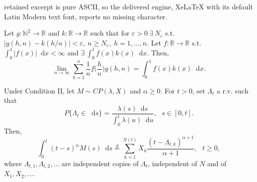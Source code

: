 \documentclass[10pt,a4paper]{amsart}
\newcommand*\dif{\mathop{}\!\mathrm{d}}  %
\begin{document}
retained excerpt is pure ASCII, so the delivered engine, XeLaTeX with its default Latin Modern text font, reports no missing character.
\begin{lemma}\label{lemmaLimiteSerieRappresentanteIntegrale}
	Let $g:\mathbb{N}^2\longrightarrow \mathbb{R}$ and $k:\mathbb{R}\longrightarrow\mathbb{R}$ such that for $\varepsilon >0\ \exists\ N_\varepsilon$ s.t. $|g(h,n) - k(h/n)|<\varepsilon,\ n\ge N_\varepsilon,\ h=1,\dots, n$. Let $f:\mathbb{R}\longrightarrow\mathbb{R}$ s.t. $\int_0^1 |f(x)|\dif x<\infty$ and $\exists\ \int_0^1 f(x)k(x)\dif x$. Then, 
	\begin{equation*}
		\lim_{n\rightarrow\infty} \sum_{h=1}^n \frac{1}{n}f\Big(\frac{h}{n}\Big) g(h,n) = \int_0^1f(x)k(x)\dif x.
	\end{equation*}
\end{lemma}

\begin{theorem}\label{teoremaIntegraleProcessoCompostoPoisson}
Under Condition II, let $M\sim CP(\lambda, X)$ and $\alpha\ge0$. For $t>0$, set $\Lambda_t$ a r.v. such that
\begin{equation}\label{distribuzioneVariabileAleatoriaLambda}
	P\{\Lambda_t\in \dif s\} = \frac{\lambda(s)\dif s}{\int_0^t \lambda(u)\dif u}, \ \ \ s\in[0,t].
\end{equation}
Then,
\begin{equation}\label{integraleProcessoCompostoPoisson}
	\int_0^t (t-s)^\alpha M(s)\dif s \stackrel{d}{=} \sum_{k=1}^{N(t)} X_k\frac{(t-\Lambda_{t,k})^{\alpha+1}}{\alpha+1},\ \ \ t\ge0,
\end{equation}	
where $\Lambda_{t,1}, \Lambda_{t,2},\dots$ are independent copies of $\Lambda_t$, independent of $N$ and of $X_1,X_2,\dots$.
\end{theorem}
\end{document}
